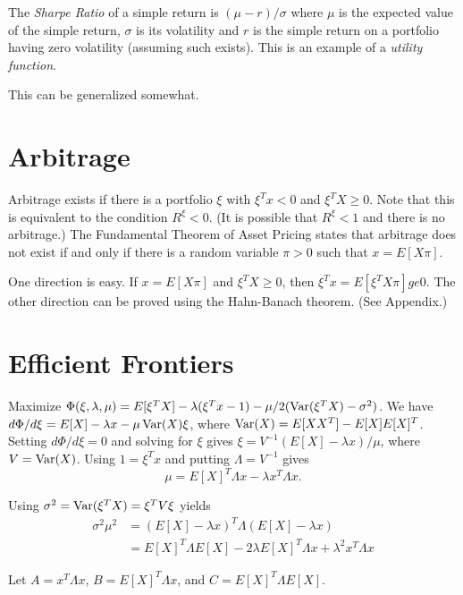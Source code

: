 \documentclass[11pt,fleqn]{amsart}
\newcommand{\Var}{\mathop{\rm{Var}}}
\begin{document}
The {\em Sharpe Ratio} of a simple return is $(\mu
- r)/\sigma$ where $\mu$ is the expected value of the simple return,
$\sigma$ is its volatility and $r$ is the simple return on a portfolio
having zero volatility (assuming such exists). This is an example
of a {\em utility function}.

This can be generalized somewhat.

\section{Arbitrage}
Arbitrage exists if there is a portfolio $\xi$ with $\xi^T x < 0$ and
$\xi^T X\ge0$. Note that this is equivalent to the condition $R^\xi
< 0$. (It is possible that $R^\xi < 1$ and there is no arbitrage.)
The Fundamental Theorem of Asset Pricing states that arbitrage does not
exist if and only if there is a random variable $\pi > 0$ such that $x
= E[X\pi]$.

One direction is easy. If $x = E[X\pi]$ and $\xi^T X\ge0$, then $\xi^T
x = E[\xi^T X\pi] ge0$. The other direction can be proved using the
Hahn-Banach theorem. (See Appendix.)

\section{Efficient Frontiers}
Maximize $\Phi(\xi, \lambda, \mu) = E[\xi^T X] - \lambda(\xi^T x - 1) -
\mu/2(\Var(\xi^T X) - \sigma^2)$. We have $d\Phi/d\xi = E[X] - \lambda
x - \mu \Var(X)\xi$, where $\Var(X) = E[XX^T] - E[X]E[X]^T$. Setting
$d\Phi/d\xi = 0$ and solving for $\xi$ gives $\xi = V^{-1}(E[X]
- \lambda x)/\mu$, where $V = \Var(X)$. Using $1 = \xi^T x$ and
putting $\Lambda = V^{-1}$ gives
\begin{equation*}
\mu = E[X]^T\Lambda x - \lambda x^T\Lambda x.
\end{equation*}

Using $\sigma^2 = \Var(\xi^T X) = \xi^T V\xi$ yields
\begin{align*}
\sigma^2\mu^2 &= (E[X] - \lambda x)^T \Lambda  (E[X] - \lambda x)\\
 &=  E[X]^T\Lambda E[X] - 2\lambda E[X]^T\Lambda x + \lambda^2 x^T\Lambda x
\end{align*}

Let $A = x^T\Lambda x$, $B = E[X]^T\Lambda x$, and $C = E[X]^T\Lambda E[X]$.
\end{document}

